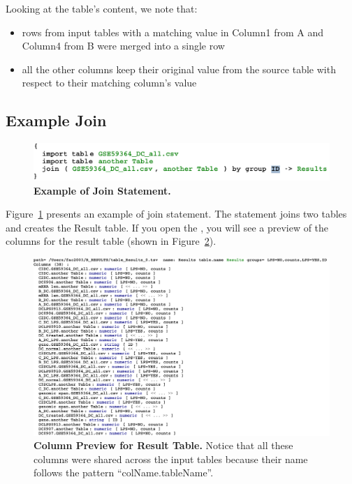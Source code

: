 Looking at the table's content, we note that:
\begin{itemize}
	\item rows from input tables with a matching value in Column1 from A and Column4 from B were merged into a single row
	\item all the other columns keep their original value from the source table with respect to their matching column's value
\end{itemize}


\subsection{Example Join}
\begin{figure}
  \centering
  \includegraphics[width=\figWidthNarrow]{figures/ExampleJoin.pdf}
\caption[Example of Join Statement.]{\textbf{Example of Join Statement.}}
\label{fig:ExampleJoinStatement}
\end{figure}

Figure~\ref{fig:ExampleJoinStatement} presents an example of join statement. The statement joins two tables and creates the Result table. If you open the \inspectorTabIcon{}, you will see a preview of the columns for the result table (shown in Figure~\ref{fig:ColumnPreviewExample}). 

\begin{figure}[h!tbp]
  \centering
  \includegraphics[width=\figWidthWide]{figures/ExampleJoinColumnPreview.pdf}
\caption[Column Preview for Result Table.]{\textbf{Column Preview for Result Table.} Notice that all these columns were shared across the input tables because their name follows the pattern ``colName.tableName''.}
\label{fig:ColumnPreviewExample}
\end{figure}


